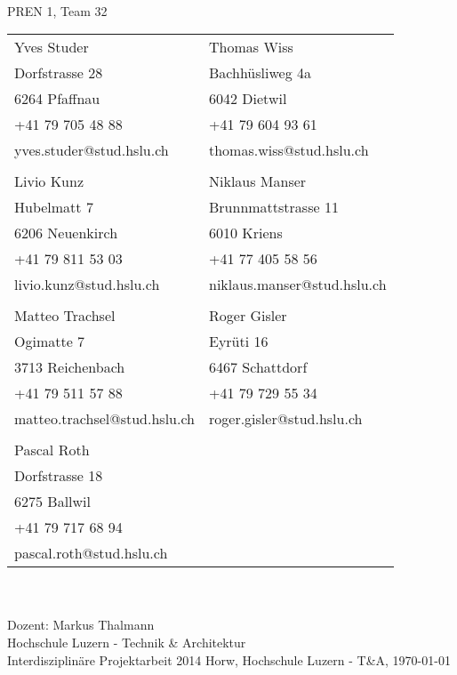 \begin{titlepage}
    \begin{center}
        \parindent0pt{\Huge\bfseries \myDokumentTyp}\\[0.5cm]
		{\huge PREN 1, Team 32}\\[2em]
        \begin{tabular}{ll}
            Yves Studer                & Thomas Wiss \\
            Dorfstrasse 28             & Bachhüsliweg 4a \\
            6264 Pfaffnau              & 6042 Dietwil \\
            +41 79 705 48 88           & +41 79 604 93 61 \\
            yves.studer@stud.hslu.ch   & thomas.wiss@stud.hslu.ch \\
                                       & \\
            Livio Kunz                 & Niklaus Manser \\
            Hubelmatt 7                & Brunnmattstrasse 11\\
            6206 Neuenkirch            & 6010 Kriens \\
            +41 79 811 53 03           & +41 77 405 58 56 \\
            livio.kunz@stud.hslu.ch    & niklaus.manser@stud.hslu.ch \\
                                       & \\
            Matteo Trachsel			   & Roger Gisler \\
            Ogimatte 7                 & Eyrüti 16\\
            3713 Reichenbach           & 6467 Schattdorf\\
            +41 79 511 57 88           & +41 79 729 55 34 \\
            matteo.trachsel@stud.hslu.ch & roger.gisler@stud.hslu.ch \\
            						   & \\
            Pascal Roth			       & \\
            Dorfstrasse 18			   & \\
            6275 Ballwil		       & \\
            +41 79 717 68 94	       & \\
            pascal.roth@stud.hslu.ch   & \\
        \end{tabular}\\
        \vspace{3em}
        {\Huge \myTitel}\\[5em]
        Dozent: Markus Thalmann\\[2em]
        Hochschule Luzern - Technik \& Architektur\\   
        Interdisziplinäre Projektarbeit 2014
        \vfill{}
        Horw, Hochschule Luzern - T\&A, \today
    \end{center}
\end{titlepage}